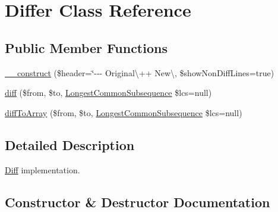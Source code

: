 \hypertarget{class_sebastian_bergmann_1_1_diff_1_1_differ}{}\section{Differ Class Reference}
\label{class_sebastian_bergmann_1_1_diff_1_1_differ}
\subsection*{Public Member Functions}
\begin{DoxyCompactItemize}
\item 
\mbox{\hyperlink{class_sebastian_bergmann_1_1_diff_1_1_differ_aeb5ad30660b5d1a5a4aadb22bb413b39}{\+\_\+\+\_\+construct}} (\$header=\char`\"{}-\/-\/-\/ Original\textbackslash{}++ New\textbackslash{}, \$show\+Non\+Diff\+Lines=true)
\item 
\mbox{\hyperlink{class_sebastian_bergmann_1_1_diff_1_1_differ_ac976438927309dedbcf002f6100a05af}{diff}} (\$from, \$to, \mbox{\hyperlink{interface_sebastian_bergmann_1_1_diff_1_1_l_c_s_1_1_longest_common_subsequence}{Longest\+Common\+Subsequence}} \$lcs=null)
\item 
\mbox{\hyperlink{class_sebastian_bergmann_1_1_diff_1_1_differ_a8d9569da1afc79c7e859627c202c51ce}{diff\+To\+Array}} (\$from, \$to, \mbox{\hyperlink{interface_sebastian_bergmann_1_1_diff_1_1_l_c_s_1_1_longest_common_subsequence}{Longest\+Common\+Subsequence}} \$lcs=null)
\end{DoxyCompactItemize}


\subsection{Detailed Description}
\mbox{\hyperlink{class_sebastian_bergmann_1_1_diff_1_1_diff}{Diff}} implementation. 

\subsection{Constructor \& Destructor Documentation}
\mbox{\label{class_sebastian_bergmann_1_1_diff_1_1_differ_aeb5ad30660b5d1a5a4aadb22bb413b39}} 
